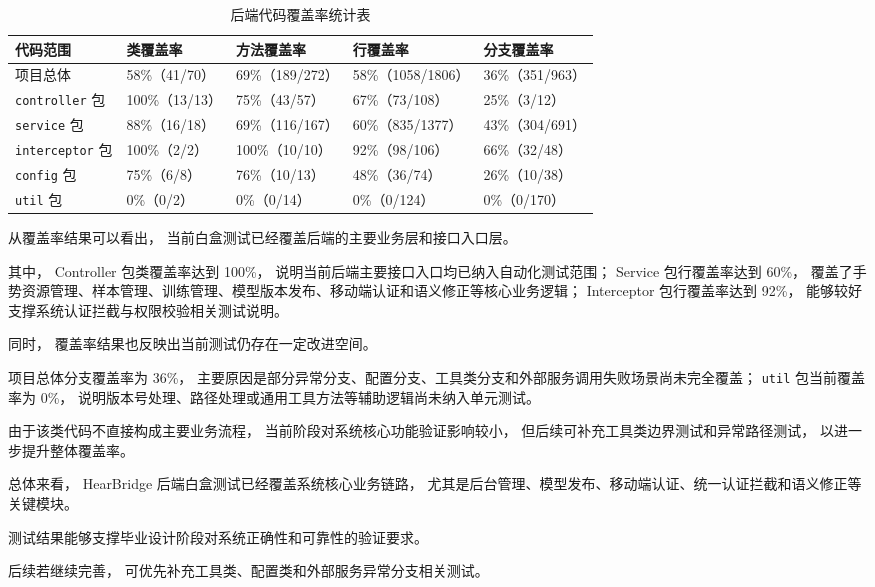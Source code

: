 \begin{longtable}{L{0.24\textwidth} R{0.18\textwidth} R{0.18\textwidth} R{0.20\textwidth} R{0.18\textwidth}}
  \caption{后端代码覆盖率统计表}
  \label{tab:chapter07-backend-coverage}\\
  \toprule
  代码范围 & 类覆盖率 & 方法覆盖率 & 行覆盖率 & 分支覆盖率 \\
  \midrule
  项目总体 & 58\%（41/70） & 69\%（189/272） & 58\%（1058/1806） & 36\%（351/963） \\
  \texttt{controller} 包 & 100\%（13/13） & 75\%（43/57） & 67\%（73/108） & 25\%（3/12） \\
  \texttt{service} 包 & 88\%（16/18） & 69\%（116/167） & 60\%（835/1377） & 43\%（304/691） \\
  \texttt{interceptor} 包 & 100\%（2/2） & 100\%（10/10） & 92\%（98/106） & 66\%（32/48） \\
  \texttt{config} 包 & 75\%（6/8） & 76\%（10/13） & 48\%（36/74） & 26\%（10/38） \\
  \texttt{util} 包 & 0\%（0/2） & 0\%（0/14） & 0\%（0/124） & 0\%（0/170） \\
  \bottomrule
\end{longtable}

从覆盖率结果可以看出，
当前白盒测试已经覆盖后端的主要业务层和接口入口层。

其中，
Controller 包类覆盖率达到 100\%，
说明当前后端主要接口入口均已纳入自动化测试范围；
Service 包行覆盖率达到 60\%，
覆盖了手势资源管理、样本管理、训练管理、模型版本发布、移动端认证和语义修正等核心业务逻辑；
Interceptor 包行覆盖率达到 92\%，
能够较好支撑系统认证拦截与权限校验相关测试说明。

同时，
覆盖率结果也反映出当前测试仍存在一定改进空间。

项目总体分支覆盖率为 36\%，
主要原因是部分异常分支、配置分支、工具类分支和外部服务调用失败场景尚未完全覆盖；
\texttt{util} 包当前覆盖率为 0\%，
说明版本号处理、路径处理或通用工具方法等辅助逻辑尚未纳入单元测试。

由于该类代码不直接构成主要业务流程，
当前阶段对系统核心功能验证影响较小，
但后续可补充工具类边界测试和异常路径测试， 
以进一步提升整体覆盖率。

总体来看，
HearBridge 后端白盒测试已经覆盖系统核心业务链路，
尤其是后台管理、模型发布、移动端认证、统一认证拦截和语义修正等关键模块。

测试结果能够支撑毕业设计阶段对系统正确性和可靠性的验证要求。

后续若继续完善，
可优先补充工具类、配置类和外部服务异常分支相关测试。